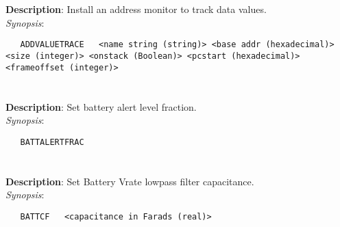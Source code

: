
\section{\quad{}}
\label{manpages:ADDVALUETRACE}
\label{manpages:addvaluetrace}
\vspace{-0.1in}
{\bf Description}: 	Install an address monitor to track data values.\\[1.5ex]
{\em Synopsis}:
\vspace{-0.05in}
\scriptsize
\begin{lstlisting}
   ADDVALUETRACE   <name string (string)> <base addr (hexadecimal)> <size (integer)> <onstack (Boolean)> <pcstart (hexadecimal)> <frameoffset (integer)>			
\end{lstlisting}
\normalsize
\vspace{-0.05in}


\section{\quad{}}
\label{manpages:BATTALERTFRAC}
\label{manpages:battalertfrac}
\vspace{-0.1in}
{\bf Description}: 	Set battery alert level fraction.\\[1.5ex]
{\em Synopsis}:
\vspace{-0.05in}
\scriptsize
\begin{lstlisting}
   BATTALERTFRAC   										
\end{lstlisting}
\normalsize
\vspace{-0.05in}


\section{\quad{}}
\label{manpages:BATTCF}
\label{manpages:battcf}
\vspace{-0.1in}
{\bf Description}: 	Set Battery Vrate lowpass filter capacitance.\\[1.5ex]
{\em Synopsis}:
\vspace{-0.05in}
\scriptsize
\begin{lstlisting}
   BATTCF   <capacitance in Farads (real)>																
\end{lstlisting}
\normalsize
\vspace{-0.05in}


